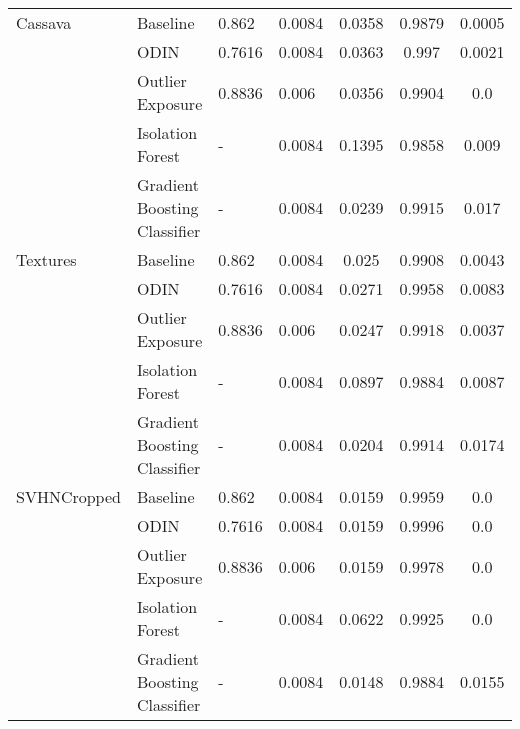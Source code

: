\documentclass{article}
\begin{document}
\begin{table}[h]
\begin{tabular}{lllHccc}
\midrule
Cassava & Baseline &         0.862 &               0.0084 &    0.0358 &  0.9879 &         0.0005 \\
            & ODIN &        0.7616 &               0.0084 &    0.0363 &   0.997 &         0.0021 \\
            & Outlier Exposure &        0.8836 &                0.006 &    0.0356 &  0.9904 &            0.0 \\
            & Isolation Forest &             - &               0.0084 &    0.1395 &  0.9858 &          0.009 \\
            & Gradient Boosting Classifier &             - &               0.0084 &    0.0239 &  0.9915 &          0.017 \\
\midrule
Textures & Baseline &         0.862 &               0.0084 &     0.025 &  0.9908 &         0.0043 \\
            & ODIN &        0.7616 &               0.0084 &    0.0271 &  0.9958 &         0.0083 \\
            & Outlier Exposure &        0.8836 &                0.006 &    0.0247 &  0.9918 &         0.0037 \\
            & Isolation Forest &             - &               0.0084 &    0.0897 &  0.9884 &         0.0087 \\
            & Gradient Boosting Classifier &             - &               0.0084 &    0.0204 &  0.9914 &         0.0174 \\
\midrule
SVHNCropped & Baseline &         0.862 &               0.0084 &    0.0159 &  0.9959 &            0.0 \\
            & ODIN &        0.7616 &               0.0084 &    0.0159 &  0.9996 &            0.0 \\
            & Outlier Exposure &        0.8836 &                0.006 &    0.0159 &  0.9978 &            0.0 \\
            & Isolation Forest &             - &               0.0084 &    0.0622 &  0.9925 &            0.0 \\
            & Gradient Boosting Classifier &             - &               0.0084 &    0.0148 &  0.9884 &         0.0155 \\
\bottomrule
\end{tabular}
\end{table}
\end{document}
